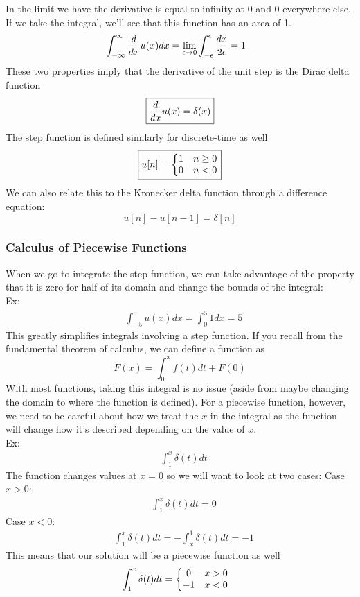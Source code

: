 \documentclass[11pt, fleqn]{article}
\begin{document}
In the limit we have the derivative is equal to infinity at 0 and 0 everywhere else. If we take the integral, we'll see that this function has an area of 1.
\begin{align*}
    &\int_{-\infty}^\infty\frac{d }{d x}u(x)dx=\lim_{\epsilon\to0}\int_{-\epsilon}^\epsilon\frac{dx}{2\epsilon}=1
\end{align*}
These two properties imply that the derivative of the unit step is the Dirac delta function
$$\boxed{\frac{d }{d x}u(x)=\delta(x)}$$
The step function is defined similarly for discrete-time as well
$$\boxed{u[n]=\left\{\begin{matrix} 1 & n\geq 0\\ 0 & n<0 \end{matrix}\right.}$$
We can also relate this to the Kronecker delta function through a difference equation:
$$\boxed{u[n]-u[n-1]=\delta[n]}$$

\subsubsection{Calculus of Piecewise Functions}
When we go to integrate the step function, we can take advantage of the property that it is zero for half of its domain and change the bounds of the integral:\\
Ex:
\begin{align*}
    &\int_{-5}^5 u(x)dx=\int_0^5 1dx=5
\end{align*}
This greatly simplifies integrals involving a step function. If you recall from the fundamental theorem of calculus, we can define a function as
$$F(x)=\int_0^x f(t)dt+F(0)$$
With most functions, taking this integral is no issue (aside from maybe changing the domain to where the function is defined). For a piecewise function, however, we need to be careful about how we treat the $x$ in the integral as the function will change how it's described depending on the value of $x$.\\
Ex:
\begin{align*}
    &\int_1^x\delta(t)dt
\end{align*}
The function changes values at $x=0$ so we will want to look at two cases:
Case $x>0$:
\begin{align*}
    &\int_1^x\delta(t)dt=0
\end{align*}
Case $x<0$:
\begin{align*}
    &\int_1^x\delta(t)dt=-\int_x^1\delta(t)dt=-1
\end{align*}
This means that our solution will be a piecewise function as well
\begin{align*}
    &\int_1^x\delta(t)dt=\left\{\begin{matrix} 0 & x>0\\ -1& x<0 \end{matrix}\right.
\end{align*}
\end{document}
